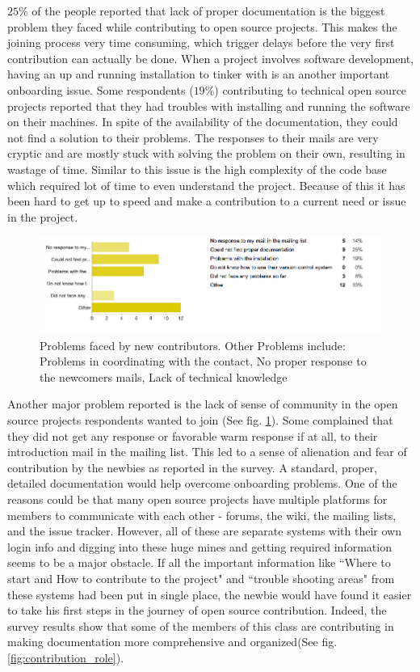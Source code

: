 $25\%$ of the people reported that lack of proper documentation is the biggest problem they faced while contributing to open source projects. This makes the joining process very time consuming, which trigger delays before the very first contribution can actually be done. When a project involves software development,  having an up and running installation to tinker with is an another important onboarding issue. Some respondents ($19\%$) contributing to technical open source projects reported that they had troubles with installing and running the software on their machines. In spite of the availability of the documentation, they could not find a solution to their problems. The responses to their mails are very cryptic and are mostly stuck with solving the problem on their own, resulting in wastage of time. Similar to this issue is the high complexity of the code base which required lot of time to even understand the project. Because of this it has been hard to get up to speed and make a contribution to a current need or issue in the project.

\begin{figure}[ht!]
\centering
\includegraphics[width=130mm]{chapters/img/problems_faced.png}
\caption{Problems faced by new contributors. Other Problems include: Problems in coordinating with the contact, No proper response to the newcomers mails, Lack of technical knowledge}
\label{fig:problem_faced}
\end{figure}

Another major problem reported is the lack of sense of community in the open source projects respondents wanted to join (See fig. \ref{fig:problem_faced}). Some complained that they did not get any response or favorable warm response if at all, to their introduction mail in the mailing list. This led to a sense of alienation and fear of contribution by the newbies as reported in the survey. A standard, proper, detailed documentation  would help overcome onboarding problems. One of the reasons could be  that many open source projects have multiple platforms for members to communicate with each other - forums, the wiki, the mailing lists, and the issue tracker. However, all of these are separate systems with their own login info and digging into these huge mines and getting required information seems to be a major obstacle. If all the important information like ``Where to start and How to contribute to the project" and ``trouble shooting areas" from these systems had been put in single place, the newbie would have found it easier to take his first steps in the journey of open source contribution. Indeed, the survey results show that some of the members of this class are contributing in making documentation more comprehensive and organized(See fig. \ref{fig:contribution_role}).


